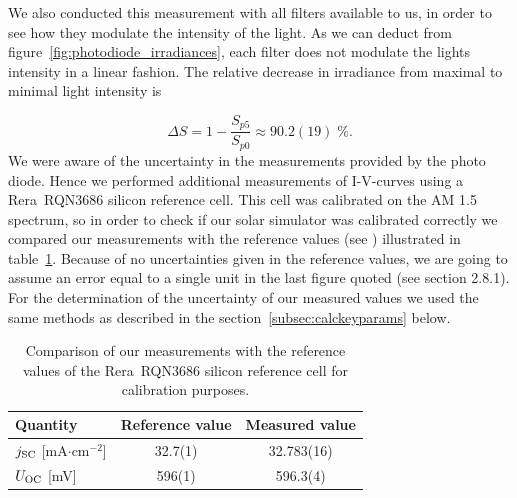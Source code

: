 \documentclass[a4paper,10pt,twocolumn]{article}
\begin{document}
\begin{extract*}
We also conducted this measurement with all filters available to us, in order to see how they modulate the intensity of the light. As we can deduct from figure~\ref{fig:photodiode_irradiances}, each filter does not modulate the lights intensity in a linear fashion. The relative decrease in irradiance from maximal to minimal light intensity is

\begin{equation}\label{eq:irrad-decrease}
	\Delta S = 1 - \frac{S_{p5}}{S_{p0}} \approx 90.2(19)\;\%.
\end{equation}
We were aware of the uncertainty in the measurements provided by the photo diode. Hence we performed additional measurements of I-V-curves using a Rera~RQN3686 silicon reference cell. This cell was calibrated on the AM 1.5 spectrum, so in order to check if our solar simulator was calibrated correctly we compared our measurements with the reference values (see \cite{reracat}) illustrated in table~\ref{tab:reracomp}. Because of no uncertainties given in the reference values, we are going to assume an error equal to a single unit in the last figure quoted (see \cite{measurements} section 2.8.1). For the determination of the uncertainty of our measured values we used the same methods as described in the section~\ref{subsec:calckeyparams} below. 
\begin{table}[h]\centering
	\caption{Comparison of our measurements with the reference values of the Rera~RQN3686 silicon reference cell for calibration purposes.}
	\label{tab:reracomp}
	\begin{tabular}{@{}lcc@{}}\toprule
		Quantity & Reference value & Measured value\\ \midrule
		$j_{\text{SC}}$ [mA$\cdot$cm$^{-2}$] & 32.7(1) & 32.783(16) \\
		$U_{\text{OC}}$ [mV]& 596(1) & 596.3(4) \\ \bottomrule
	\end{tabular}
\end{table}


\end{extract*}
\end{document}
